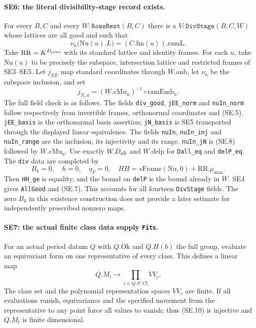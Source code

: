\paragraph{SE6: the literal divisibility-stage record exists.}
For every $B,C$ and every $W:\texttt{RowsRest}(B,C)$ there is a
$V:\texttt{DivStage}(B,C,W)$ whose lattices are all good and such that
\[
 \nu_u\bigl(\mathrm{Nu}(u).L\bigr)=(C.\mathrm{fm}(u)).\mathrm{ramL}.
 \tag{SE.7}
\]
Take $\mathrm{RR}=K^{D_{\rm rows}}$ with its standard lattice and
identity frames. For each $u$, take $\mathrm{Nu}(u)$ to be precisely
the subspace, intersection lattice and restricted frames of SE3--SE5.
Let $j_{EE}$ map standard coordinates through $W.\mathrm{onb}$, let
$\nu_u$ be the subspace inclusion, and set
\[
 j_{N,u}=(W.e\mathrm{Mu}_u)^{-1}\circ\mathrm{ramEmb}_u.
 \tag{SE.8}
\]
The full field check is as follows. The fields \texttt{div\_good},
\texttt{jEE\_norm} and \texttt{nuIn\_norm} follow respectively from
invertible frames, orthonormal coordinates and (SE.5).
\texttt{jEE\_basis} is the orthonormal basis assertion;
\texttt{jN\_basis} is SE5 transported through the displayed linear
equivalence. The fields \texttt{nuIn}, \texttt{nuIn\_inj} and
\texttt{nuIn\_range} are the inclusion, its injectivity and its range.
\texttt{nuIn\_jN} is (SE.8) followed by $W.e\mathrm{Mu}_u$.
Use exactly $W.D_{\rm all}$ and $W.\mathrm{delp}$ for
\texttt{Dall\_eq} and \texttt{delP\_eq}. The \texttt{div} data are
completed by
\[
 B_k=0,\quad h=0,\quad\eta_F=0,\quad
 HH=s\mathrm{Frame}(\mathrm{Nu},0)+\mathrm{RR}.\mu_{\max}.
 \tag{SE.9}
\]
Then \texttt{HH\_ge} is equality, and the bound on \texttt{delP}
is the bound already in $W$. SE4 gives \texttt{AllGood} and (SE.7).
This accounts for all fourteen \texttt{DivStage} fields. The zero
$B_k$ in this existence construction does not provide a later estimate
for independently prescribed nonzero maps.

\paragraph{SE7: the actual finite class data supply \texttt{Fits}.}
For an actual period datum $Q$ with $Q.\mathrm{Ok}$ and $Q.H(b)$ the
full group, evaluate an equivariant form on one representative of every
class. This defines a linear map
\[
 Q.M_t\longrightarrow\prod_{c\in Q.S'.\mathrm{Cl}} VV_c.
 \tag{SE.10}
\]
The class set and the polynomial representation spaces $VV_c$ are
finite. If all evaluations vanish, equivariance and the specified
movement from the representative to any point force all values to
vanish; thus (SE.10) is injective and $Q.M_t$ is finite dimensional.


